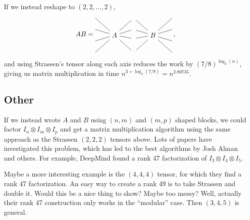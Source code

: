 If we instead reshape to $(2,2,\dots,2)$,
\[
AB = 
   \begin{tikzpicture}[baseline=-1em, y=1.7em]
      \node (P1) at (0,-.5) {$A$};
      \node (A) at (1,1) {};
      \node (P2) at (2,-.5) {$B$};
      \node (B) at (1,0) {};
      \node (C) at (1,-.8) {};
      \node (D) at (1,-2) {};
      \draw (-1,1) -- (P1) -- (A) -- (P2) -- (3, 1);
      \draw (-1,0) -- (P1) -- (B) -- (P2) -- (3, 0);
      \draw (-1,-1) -- (P1) -- (C) -- (P2) -- (3, -1);
      \draw (-1,-2) -- (P1) -- (D) -- (P2) -- (3, -2);
   \end{tikzpicture}
   \,,
\]
and using Strassen's tensor along each axis reduces the work by $(7/8)^{\log_2(n)}$, giving us matrix multiplication in time $n^{3 + \log_2(7/8)} = n^{2.80735}$.

\subsection{Other}

If we instead wrote $A$ and $B$ using $(n,m)$ and $(m,p)$ shaped blocks, we could factor $I_n\otimes I_m\otimes I_p$ and get a matrix multiplication algorithm using the same approach as the Strassen $(2,2,2)$ tensors above.
Lots of papers have investigated this problem, which has led to the best algorithms by Josh Alman and others.
For example, DeepMind found a rank 47 factorization of $I_3\otimes I_4\otimes I_5$.

Maybe a more interesting example is the $(4,4,4)$ tensor, for which they find a rank 47 factorization.
An easy way to create a rank 49 is to take Strassen and double it.
Would this be a nice thing to show? Maybe too messy?
Well, actually their rank 47 construction only works in the ``modular'' case. Then $(3,4,5)$ is general.

